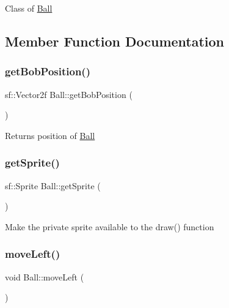 Class of \mbox{\hyperlink{class_ball}{Ball}} 



\subsection{Member Function Documentation}
\mbox{\label{class_ball_a34fbfdd4fc49e594be834addef1b18c8}} 
\subsubsection{\texorpdfstring{getBobPosition()}{getBobPosition()}}
{\footnotesize\ttfamily sf\+::\+Vector2f Ball\+::get\+Bob\+Position (\begin{DoxyParamCaption}{ }\end{DoxyParamCaption})}



Returns position of \mbox{\hyperlink{class_ball}{Ball}} 

\mbox{\label{class_ball_ab6c828e025d651a37b2644d72ed0cd7c}} 
\subsubsection{\texorpdfstring{getSprite()}{getSprite()}}
{\footnotesize\ttfamily sf\+::\+Sprite Ball\+::get\+Sprite (\begin{DoxyParamCaption}{ }\end{DoxyParamCaption})}



Make the private sprite available to the draw() function 

\mbox{\label{class_ball_ab50947921f203f92a3bfcf424247a47f}} 
\subsubsection{\texorpdfstring{moveLeft()}{moveLeft()}}
{\footnotesize\ttfamily void Ball\+::move\+Left (\begin{DoxyParamCaption}{ }\end{DoxyParamCaption})}



